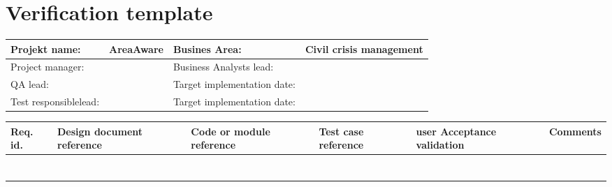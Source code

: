 
\begin{sidewaystable}
\chapter{Verification template}
	\label{chp_appendixTemplate}
	\renewcommand\arraystretch{1.5}
	\begin{longtable}{| p{3.5cm}  | p{4.6cm} |  p{5cm}  | p{5cm} |}\hline
		Projekt name: 	& AreaAware & Busines Area:	& Civil crisis management \\ \hline
		Project manager:& & Business Analysts lead: 	& \\ \hline
		QA lead: 		& & Target implementation date:	& \\ \hline
		Test responsiblelead: 		& & Target implementation date:	& \\ \hline
	\end{longtable}
	\vspace{-9pt}
	\begin{longtable}{| p{1.5cm}  | p{3cm}  | p{4.2cm} |  p{1.5cm}  | p{4cm}  |  p{3cm}  |} \hline
		Req. id. & Design document reference & Code or module reference & Test case reference & user Acceptance validation  & Comments \\ \hline	
		&& && & \\ \hline
		&& && & \\ \hline
		&& && &\\ \hline
		&& && & \\ \hline
		&& && & \\ \hline
		&& && &  \\ \hline
		&& && &  \\ \hline
	\end{longtable}
	\renewcommand\arraystretch{1}
\end{sidewaystable}




